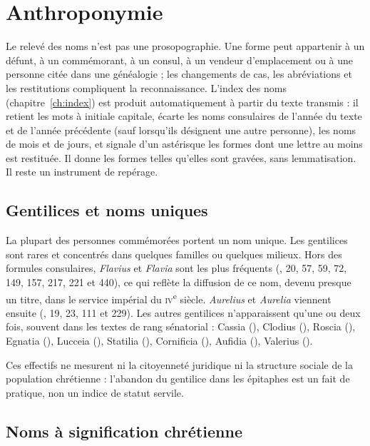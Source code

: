 \chapter{Anthroponymie}\label{ch:noms}

Le relevé des noms n’est pas une prosopographie. Une forme peut appartenir à un défunt, à un commémorant, à un consul, à un vendeur d’emplacement ou à une personne citée dans une généalogie ; les changements de cas, les abréviations et les restitutions compliquent la reconnaissance. L’index des noms (chapitre~\ref{ch:index}) est produit automatiquement à partir du texte transmis : il retient les mots à initiale capitale, écarte les noms consulaires de l’année du texte et de l’année précédente (sauf lorsqu’ils désignent une autre personne), les noms de mois et de jours, et signale d’un astérisque les formes dont une lettre au moins est restituée. Il donne les formes telles qu’elles sont gravées, sans lemmatisation. Il reste un instrument de repérage.

\section{Gentilices et noms uniques}

La plupart des personnes commémorées portent un nom unique. Les gentilices sont rares et concentrés dans quelques familles ou quelques milieux. Hors des formules consulaires, \emph{Flavius} et \emph{Flavia} sont les plus fréquents (, 20, 57, 59, 72, 149, 157, 217, 221 et 440), ce qui reflète la diffusion de ce nom, devenu presque un titre, dans le service impérial du \textsc{iv}\textsuperscript{e} siècle. \emph{Aurelius} et \emph{Aurelia} viennent ensuite (, 19, 23, 111 et 229). Les autres gentilices n’apparaissent qu’une ou deux fois, souvent dans les textes de rang sénatorial : Cassia (), Clodius (), Roscia (), Egnatia (), Lucceia (), Statilia (), Cornificia (), Aufidia (), Valerius ().

Ces effectifs ne mesurent ni la citoyenneté juridique ni la structure sociale de la population chrétienne : l’abandon du gentilice dans les épitaphes est un fait de pratique, non un indice de statut servile.

\section{Noms à signification chrétienne}

